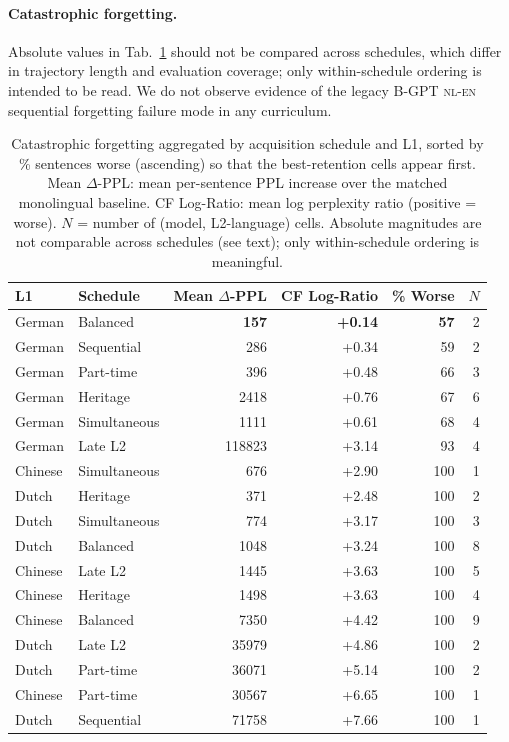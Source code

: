 \paragraph{Catastrophic forgetting.} Absolute values in Tab.~\ref{tab:forgetting} should not be compared across schedules, which differ in trajectory length and evaluation coverage; only within-schedule ordering is intended to be read. We do not observe evidence of the legacy B-GPT \textsc{nl-en} sequential forgetting failure mode in any \beetle{} curriculum.

\begin{table}[!ht]
  \centering
  \small
  \caption{Catastrophic forgetting aggregated by acquisition schedule and L1, sorted by \% sentences worse (ascending) so that the best-retention cells appear first. Mean $\Delta$-PPL: mean per-sentence PPL increase over the matched monolingual baseline. CF Log-Ratio: mean log perplexity ratio (positive = worse). $N$ = number of (model, L2-language) cells. Absolute magnitudes are not comparable across schedules (see text); only within-schedule ordering is meaningful.}
  \label{tab:forgetting}
  \begin{tabular}{llrrrr}
    \toprule
    L1 & Schedule & Mean $\Delta$-PPL & CF Log-Ratio & \% Worse & $N$ \\
    \midrule
    German  & Balanced     & \textbf{157} & \textbf{+0.14} & \textbf{57} & 2 \\
    German  & Sequential   & 286   & +0.34 & 59  & 2 \\
    German  & Part-time    & 396   & +0.48 & 66  & 3 \\
    German  & Heritage     & 2418  & +0.76 & 67  & 6 \\
    German  & Simultaneous & 1111  & +0.61 & 68  & 4 \\
    German  & Late L2      & 118823 & +3.14 & 93 & 4 \\
    Chinese & Simultaneous & 676   & +2.90 & 100 & 1 \\
    Dutch   & Heritage     & 371   & +2.48 & 100 & 2 \\
    Dutch   & Simultaneous & 774   & +3.17 & 100 & 3 \\
    Dutch   & Balanced     & 1048  & +3.24 & 100 & 8 \\
    Chinese & Late L2      & 1445  & +3.63 & 100 & 5 \\
    Chinese & Heritage     & 1498  & +3.63 & 100 & 4 \\
    Chinese & Balanced     & 7350  & +4.42 & 100 & 9 \\
    Dutch   & Late L2      & 35979 & +4.86 & 100 & 2 \\
    Dutch   & Part-time    & 36071 & +5.14 & 100 & 2 \\
    Chinese & Part-time    & 30567 & +6.65 & 100 & 1 \\
    Dutch   & Sequential   & 71758 & +7.66 & 100 & 1 \\
    \bottomrule
  \end{tabular}
\end{table}

